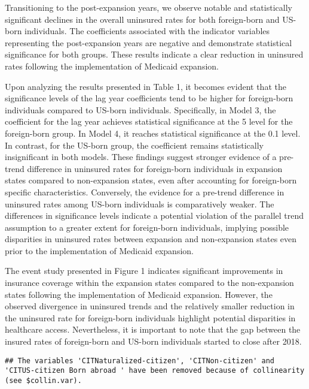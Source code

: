 \documentclass[
]{article}
\begin{document}
Transitioning to the post-expansion years, we observe notable and
statistically significant declines in the overall uninsured rates for
both foreign-born and US-born individuals. The coefficients associated
with the indicator variables representing the post-expansion years are
negative and demonstrate statistical significance for both groups. These
results indicate a clear reduction in uninsured rates following the
implementation of Medicaid expansion.

Upon analyzing the results presented in Table 1, it becomes evident that
the significance levels of the lag year coefficients tend to be higher
for foreign-born individuals compared to US-born individuals.
Specifically, in Model 3, the coefficient for the lag year achieves
statistical significance at the 5 level for the foreign-born group. In
Model 4, it reaches statistical significance at the 0.1 level. In
contrast, for the US-born group, the coefficient remains statistically
insignificant in both models. These findings suggest stronger evidence
of a pre-trend difference in uninsured rates for foreign-born
individuals in expansion states compared to non-expansion states, even
after accounting for foreign-born specific characteristics. Conversely,
the evidence for a pre-trend difference in uninsured rates among US-born
individuals is comparatively weaker. The differences in significance
levels indicate a potential violation of the parallel trend assumption
to a greater extent for foreign-born individuals, implying possible
disparities in uninsured rates between expansion and non-expansion
states even prior to the implementation of Medicaid expansion.

The event study presented in Figure 1 indicates significant improvements
in insurance coverage within the expansion states compared to the
non-expansion states following the implementation of Medicaid expansion.
However, the observed divergence in uninsured trends and the relatively
smaller reduction in the uninsured rate for foreign-born individuals
highlight potential disparities in healthcare access. Nevertheless, it
is important to note that the gap between the insured rates of
foreign-born and US-born individuals started to close after 2018.

\begin{verbatim}
## The variables 'CITNaturalized-citizen', 'CITNon-citizen' and 'CITUS-citizen Born abroad ' have been removed because of collinearity (see $collin.var).
\end{verbatim}
\end{document}
